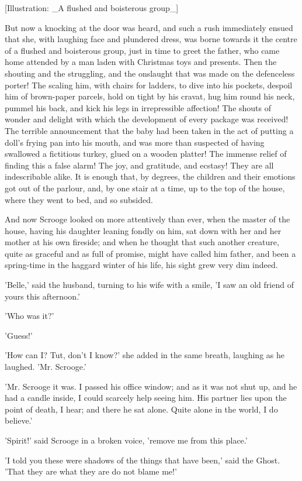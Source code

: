 [Illustration: _A flushed and boisterous group_]

But now a knocking at the door was heard, and such a rush immediately
ensued that she, with laughing face and plundered dress, was borne
towards it the centre of a flushed and boisterous group, just in time to
greet the father, who came home attended by a man laden with Christmas
toys and presents. Then the shouting and the struggling, and the
onslaught that was made on the defenceless porter! The scaling him, with
chairs for ladders, to dive into his pockets, despoil him of
brown-paper parcels, hold on tight by his cravat, hug him round his
neck, pummel his back, and kick his legs in irrepressible affection! The
shouts of wonder and delight with which the development of every package
was received! The terrible announcement that the baby had been taken in
the act of putting a doll's frying pan into his mouth, and was more than
suspected of having swallowed a fictitious turkey, glued on a wooden
platter! The immense relief of finding this a false alarm! The joy, and
gratitude, and ecstasy! They are all indescribable alike. It is enough
that, by degrees, the children and their emotions got out of the
parlour, and, by one stair at a time, up to the top of the house, where
they went to bed, and so subsided.

And now Scrooge looked on more attentively than ever, when the master of
the house, having his daughter leaning fondly on him, sat down with her
and her mother at his own fireside; and when he thought that such
another creature, quite as graceful and as full of promise, might have
called him father, and been a spring-time in the haggard winter of his
life, his sight grew very dim indeed.

'Belle,' said the husband, turning to his wife with a smile, 'I saw an
old friend of yours this afternoon.'

'Who was it?'

'Guess!'

'How can I? Tut, don't I know?' she added in the same breath, laughing
as he laughed. 'Mr. Scrooge.'

'Mr. Scrooge it was. I passed his office window; and as it was not shut
up, and he had a candle inside, I could scarcely help seeing him. His
partner lies upon the point of death, I hear; and there he sat alone.
Quite alone in the world, I do believe.'

'Spirit!' said Scrooge in a broken voice, 'remove me from this place.'

'I told you these were shadows of the things that have been,' said the
Ghost. 'That they are what they are do not blame me!'

